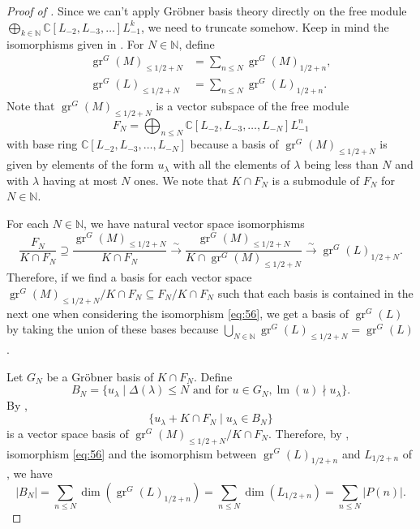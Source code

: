 \documentclass[a4paper, 12pt, reqno]{amsart}
\theoremstyle{remark}
\numberwithin{equation}{subsection}
\DeclareMathOperator{\gr}{gr}
\DeclareMathOperator{\lm}{lm}
\begin{document}
\begin{proof}[Proof of ]
  Since we can't apply Gr\"{o}bner basis theory directly on the free module $\bigoplus_{k \in \mathbb{N}}\mathbb{C}[L_{-2}, L_{-3}, \dots]L_{-1}^k$, we need to truncate somehow.
  Keep in mind the isomorphisms given in .
  For $N \in \mathbb{N}$, define
  \begin{align*}
    \gr^G(M)_{\le 1/2 + N} &= \sum_{n \le N}\gr^G(M)_{1/2 + n}, \\
    \gr^G(L)_{\le 1/2 + N} &= \sum_{n \le N}\gr^G(L)_{1/2 + n}.
  \end{align*}
  Note that $\gr^G(M)_{\le 1/2 + N}$ is a vector subspace of the free module
  \begin{equation*}
    F_N = \bigoplus_{n \le N}\mathbb{C}[L_{-2}, L_{-3}, \dots, L_{-N}]L_{-1}^n
  \end{equation*}
  with base ring $\mathbb{C}[L_{-2}, L_{-3}, \dots, L_{-N}]$ because a basis of $\gr^G(M)_{\le 1/2 + N}$ is given by elements of the form $u_\lambda$ with all the elements of $\lambda$ being less than $N$ and with $\lambda$ having at most $N$ ones.
  We note that $K \cap F_N$ is a submodule of $F_N$ for $N \in \mathbb{N}$.
  
  For each $N \in \mathbb{N}$, we have natural vector space isomorphisms
  \begin{equation}
    \label{eq:56}
    \frac{F_N}{K \cap F_N} \supseteq \frac{\gr^G(M)_{\le 1/2 + N}}{K \cap F_N} \xrightarrow{\sim} \frac{\gr^G(M)_{\le 1/2 + N}}{K \cap \gr^G(M)_{\le 1/2 + N}} \xrightarrow{\sim} \gr^G(L)_{1/2 + N}.
  \end{equation}
  Therefore, if we find a basis for each vector space $\gr^G(M)_{\le 1/2 + N}/K \cap F_N \subseteq F_N/K \cap F_N$ such that each basis is contained in the next one when considering the isomorphism \eqref{eq:56}, we get a basis of $\gr^G(L)$ by taking the union of these bases because $\bigcup_{N \in \mathbb{N}}\gr^G(L)_{\le 1/2 + N} = \gr^G(L)$.
  
  Let $G_N$ be a Gr\"{o}bner basis of $K \cap F_N$.
  Define
  \begin{equation*}
    B_N = \{u_\lambda \mid \Delta(\lambda) \le N\text{ and for }u \in G_N, \lm(u) \nmid u_\lambda\}.
  \end{equation*}
  By \cite[Proposition 3.6.4]{adams_introduction_1994},
  \begin{equation}
    \label{eq:57}
    \{u_\lambda + K \cap F_N \mid u_\lambda \in B_N\}
  \end{equation}
  is a vector space basis of $\gr^G(M)_{\le 1/2 + N}/K \cap F_N$.
  Therefore, by , isomorphism \eqref{eq:56} and the isomorphism between $\gr^G(L)_{1/2 + n}$ and $L_{1/2 + n}$ of , we have
  \begin{equation*}
    |B_N| = \sum_{n \le N}\dim(\gr^G(L)_{1/2 + n}) = \sum_{n \le N}\dim(L_{1/2 + n}) = \sum_{n \le N}|P(n)|.
  \end{equation*}
  

\end{proof}
\end{document}
